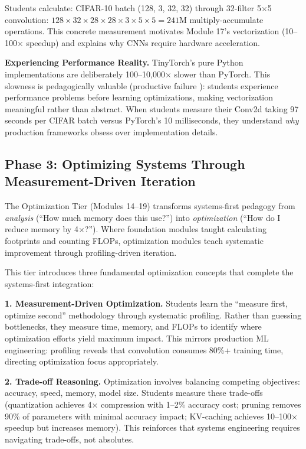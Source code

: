 \documentclass[10pt,twocolumn]{article}
\begin{document}
Students calculate: CIFAR-10 batch (128, 3, 32, 32) through 32-filter 5$\times$5 convolution: $128 \times 32 \times 28 \times 28 \times 3 \times 5 \times 5 = 241$M multiply-accumulate operations. This concrete measurement motivates Module 17's vectorization (10--100$\times$ speedup) and explains why CNNs require hardware acceleration.

\textbf{Experiencing Performance Reality.} TinyTorch's pure Python implementations are deliberately 100--10,000$\times$ slower than PyTorch. This slowness is pedagogically valuable (productive failure \citep{kapur2008}): students experience performance problems before learning optimizations, making vectorization meaningful rather than abstract. When students measure their Conv2d taking 97 seconds per CIFAR batch versus PyTorch's 10 milliseconds, they understand \emph{why} production frameworks obsess over implementation details.

\subsection{Phase 3: Optimizing Systems Through Measurement-Driven Iteration}

The Optimization Tier (Modules 14--19) transforms systems-first pedagogy from \emph{analysis} (``How much memory does this use?'') into \emph{optimization} (``How do I reduce memory by 4$\times$?''). Where foundation modules taught calculating footprints and counting FLOPs, optimization modules teach systematic improvement through profiling-driven iteration.

This tier introduces three fundamental optimization concepts that complete the systems-first integration:

\textbf{1. Measurement-Driven Optimization.} Students learn the ``measure first, optimize second'' methodology through systematic profiling. Rather than guessing bottlenecks, they measure time, memory, and FLOPs to identify where optimization efforts yield maximum impact. This mirrors production ML engineering: profiling reveals that convolution consumes 80\%+ training time, directing optimization focus appropriately.

\textbf{2. Trade-off Reasoning.} Optimization involves balancing competing objectives: accuracy, speed, memory, model size. Students measure these trade-offs (quantization achieves 4$\times$ compression with 1--2\% accuracy cost; pruning removes 90\% of parameters with minimal accuracy impact; KV-caching achieves 10--100$\times$ speedup but increases memory). This reinforces that systems engineering requires navigating trade-offs, not absolutes.
\end{document}
